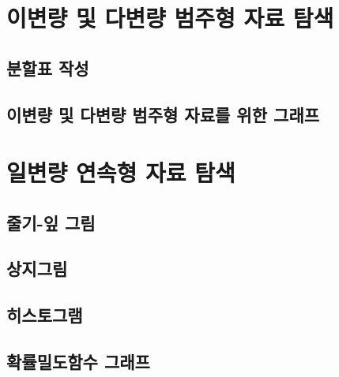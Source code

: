 \documentclass[
]{book}
\begin{document}
\hypertarget{uxc774uxbcc0uxb7c9-uxbc0f-uxb2e4uxbcc0uxb7c9-uxbc94uxc8fcuxd615-uxc790uxb8cc-uxd0d0uxc0c9}{%
\section{이변량 및 다변량 범주형 자료 탐색}\label{uxc774uxbcc0uxb7c9-uxbc0f-uxb2e4uxbcc0uxb7c9-uxbc94uxc8fcuxd615-uxc790uxb8cc-uxd0d0uxc0c9}}

\hypertarget{uxbd84uxd560uxd45c-uxc791uxc131}{%
\subsection{분할표 작성}\label{uxbd84uxd560uxd45c-uxc791uxc131}}

\hypertarget{uxc774uxbcc0uxb7c9-uxbc0f-uxb2e4uxbcc0uxb7c9-uxbc94uxc8fcuxd615-uxc790uxb8ccuxb97c-uxc704uxd55c-uxadf8uxb798uxd504}{%
\subsection{이변량 및 다변량 범주형 자료를 위한 그래프}\label{uxc774uxbcc0uxb7c9-uxbc0f-uxb2e4uxbcc0uxb7c9-uxbc94uxc8fcuxd615-uxc790uxb8ccuxb97c-uxc704uxd55c-uxadf8uxb798uxd504}}

\hypertarget{uxc77cuxbcc0uxb7c9-uxc5f0uxc18duxd615-uxc790uxb8cc-uxd0d0uxc0c9}{%
\section{일변량 연속형 자료 탐색}\label{uxc77cuxbcc0uxb7c9-uxc5f0uxc18duxd615-uxc790uxb8cc-uxd0d0uxc0c9}}

\hypertarget{uxc904uxae30-uxc78e-uxadf8uxb9bc}{%
\subsection{줄기-잎 그림}\label{uxc904uxae30-uxc78e-uxadf8uxb9bc}}

\hypertarget{uxc0c1uxc9c0uxadf8uxb9bc}{%
\subsection{상지그림}\label{uxc0c1uxc9c0uxadf8uxb9bc}}

\hypertarget{uxd788uxc2a4uxd1a0uxadf8uxb7a8}{%
\subsection{히스토그램}\label{uxd788uxc2a4uxd1a0uxadf8uxb7a8}}

\hypertarget{uxd655uxb960uxbc00uxb3c4uxd568uxc218-uxadf8uxb798uxd504}{%
\subsection{확률밀도함수 그래프}\label{uxd655uxb960uxbc00uxb3c4uxd568uxc218-uxadf8uxb798uxd504}}
\end{document}
